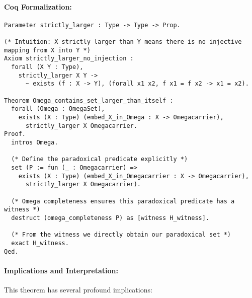 \documentclass[12pt]{article}
\begin{document}
\paragraph{Coq Formalization:}
\begin{lstlisting}[language=Coq]
Parameter strictly_larger : Type -> Type -> Prop.

(* Intuition: X strictly larger than Y means there is no injective mapping from X into Y *)
Axiom strictly_larger_no_injection :
  forall (X Y : Type),
    strictly_larger X Y ->
      ~ exists (f : X -> Y), (forall x1 x2, f x1 = f x2 -> x1 = x2).

Theorem Omega_contains_set_larger_than_itself :
  forall (Omega : OmegaSet),
    exists (X : Type) (embed_X_in_Omega : X -> Omegacarrier),
      strictly_larger X Omegacarrier.
Proof.
  intros Omega.

  (* Define the paradoxical predicate explicitly *)
  set (P := fun (_ : Omegacarrier) =>
    exists (X : Type) (embed_X_in_Omegacarrier : X -> Omegacarrier),
      strictly_larger X Omegacarrier).

  (* Omega completeness ensures this paradoxical predicate has a witness *)
  destruct (omega_completeness P) as [witness H_witness].

  (* From the witness we directly obtain our paradoxical set *)
  exact H_witness.
Qed.
\end{lstlisting}

\paragraph{Implications and Interpretation:}
This theorem has several profound implications:
\end{document}

